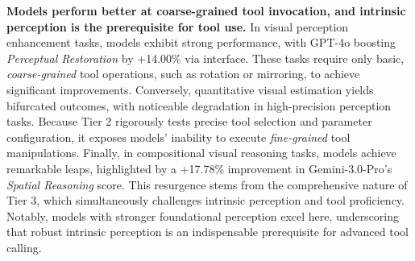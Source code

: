 \documentclass[runningheads]{llncs}
\begin{document}
\noindent \textbf{Models perform better at coarse-grained tool invocation, and intrinsic perception is the prerequisite for tool use.}
In visual perception enhancement tasks, models exhibit strong performance, with GPT-4o boosting \textit{Perceptual Restoration} by +14.00\% via interface.
These tasks require only basic, \textit{coarse-grained} tool operations, such as rotation or mirroring, to achieve significant improvements.
Conversely, quantitative visual estimation yields bifurcated outcomes, with noticeable degradation in high-precision perception tasks. Because Tier 2 rigorously tests precise tool selection and parameter configuration, it exposes models' inability to execute \textit{fine-grained} tool manipulations.
Finally, in compositional visual reasoning tasks, models achieve remarkable leaps, highlighted by a +17.78\% improvement in Gemini-3.0-Pro's \textit{Spatial Reasoning} score.
This resurgence stems from the comprehensive nature of Tier 3, which simultaneously challenges intrinsic perception and tool proficiency.
Notably, models with stronger foundational perception excel here, underscoring that robust intrinsic perception is an indispensable prerequisite for advanced tool calling.
\end{document}
